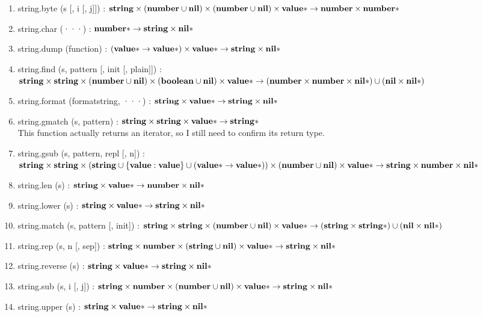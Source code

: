 \begin{enumerate}
\item string.byte (s [, i [, j]]) :
$\mathbf{string} \times
(\mathbf{number} \cup \mathbf{nil}) \times
(\mathbf{number} \cup \mathbf{nil}) \times
\mathbf{value}{*} \rightarrow
\mathbf{number} \times
\mathbf{number}{*}$
\item string.char (···) :
$\mathbf{number}{*} \rightarrow
\mathbf{string} \times
\mathbf{nil}{*}$
\item string.dump (function) :
$(\mathbf{value}{*} \rightarrow \mathbf{value}{*}) \times
\mathbf{value}{*} \rightarrow
\mathbf{string} \times
\mathbf{nil}{*}$
\item string.find (s, pattern [, init [, plain]]) :
$\mathbf{string} \times
\mathbf{string} \times
(\mathbf{number} \cup \mathbf{nil}) \times
(\mathbf{boolean} \cup \mathbf{nil}) \times
\mathbf{value}{*} \rightarrow
(\mathbf{number} \times \mathbf{number} \times \mathbf{nil}{*}) \cup
(\mathbf{nil} \times \mathbf{nil}{*})$
\item string.format (formatstring, ···) :
$\mathbf{string} \times
\mathbf{value}{*} \rightarrow
\mathbf{string} \times
\mathbf{nil}{*}$
\item string.gmatch (s, pattern) :
$\mathbf{string} \times
\mathbf{string} \times
\mathbf{value}{*} \rightarrow
\mathbf{string}{*}$
\\
This function actually returns an iterator,
so I still need to confirm its return type.
\item string.gsub (s, pattern, repl [, n]) :
$\mathbf{string} \times
\mathbf{string} \times
(\mathbf{string} \cup \{ \mathbf{value}:\mathbf{value} \} \cup (\mathbf{value}{*} \rightarrow \mathbf{value}{*})) \times
(\mathbf{number} \cup \mathbf{nil}) \times
\mathbf{value}{*} \rightarrow
\mathbf{string} \times
\mathbf{number} \times
\mathbf{nil}{*}$
\item string.len (s) :
$\mathbf{string} \times
\mathbf{value}{*} \rightarrow
\mathbf{number} \times
\mathbf{nil}{*}$
\item string.lower (s) :
$\mathbf{string} \times
\mathbf{value}{*} \rightarrow
\mathbf{string} \times
\mathbf{nil}{*}$
\item string.match (s, pattern [, init]) :
$\mathbf{string} \times
\mathbf{string} \times
(\mathbf{number} \cup \mathbf{nil}) \times
\mathbf{value}{*} \rightarrow
(\mathbf{string} \times \mathbf{string}{*}) \cup
(\mathbf{nil} \times \mathbf{nil}{*})$
\item string.rep (s, n [, sep]) :
$\mathbf{string} \times
\mathbf{number} \times
(\mathbf{string} \cup \mathbf{nil}) \times
\mathbf{value}{*} \rightarrow
\mathbf{string} \times
\mathbf{nil}{*}$
\item string.reverse (s) :
$\mathbf{string} \times
\mathbf{value}{*} \rightarrow
\mathbf{string} \times
\mathbf{nil}{*}$
\item string.sub (s, i [, j]) :
$\mathbf{string} \times
\mathbf{number} \times
(\mathbf{number} \cup \mathbf{nil}) \times
\mathbf{value}{*} \rightarrow
\mathbf{string} \times
\mathbf{nil}{*}$
\item string.upper (s) :
$\mathbf{string} \times
\mathbf{value}{*} \rightarrow
\mathbf{string} \times
\mathbf{nil}{*}$
\end{enumerate}

